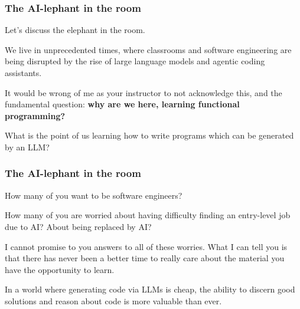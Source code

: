 \documentclass[aspectratio=169, handout]{beamer}
\begin{document}

\begin{frame}[fragile]
  \frametitle{The AI-lephant in the room}

  Let's discuss the elephant in the room.

  \pause
  \vspace{\fill}

  We live in unprecedented times, where classrooms and software engineering are being
  disrupted by the rise of large language models and agentic coding assistants.

  \pause
  \vspace{\fill}

  It would be wrong of me as your instructor to not acknowledge this, and the fundamental
  question: \textbf{why are we here, learning functional programming?}

  \pause
  \vspace{\fill}

  What is the point of us learning how to write programs which can be generated by
  an LLM?
\end{frame}

\begin{frame}[fragile]
  \frametitle{The AI-lephant in the room}

  How many of you want to be software engineers?

  \pause
  \vspace{\fill}

  How many of you are worried about having difficulty finding an entry-level job due
  to AI? About being replaced by AI?

  \pause
  \vspace{\fill}

  I cannot promise to you answers to all of these worries. What I can tell you is that
  there has never been a better time to really care about the material you
  have the opportunity to learn.

  \pause
  \vspace{\fill}

  In a world where generating code via LLMs is cheap, the ability to discern good solutions
  and reason about code is more valuable than ever.
\end{frame}
\end{document}
